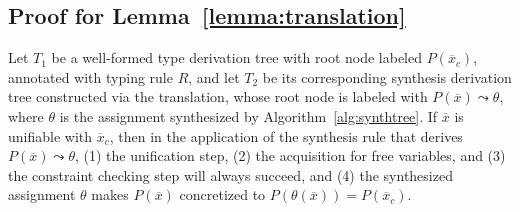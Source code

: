 \subsection{Proof for Lemma~\ref{lemma:translation}}
\label{sec:appendix-lemma3}
\begin{lemma}
Let $T_1$ be a well-formed type derivation tree with root node labeled $P(\overline{x}_c)$, annotated with typing rule $R$, and let $T_2$ be its corresponding synthesis derivation tree constructed via the translation, whose root node is labeled with $P(\overline{x}) \leadsto \theta$, where $\theta$ is the assignment synthesized by Algorithm~\ref{alg:synthtree}.
If $\overline{x}$ is unifiable with $\overline{x}_c$, then in the application of the synthesis rule that derives $P(\overline{x}) \leadsto \theta$, (1) the unification step, (2) the acquisition for free variables, and (3) the constraint checking step will always succeed, and (4) the synthesized assignment $\theta$ makes $P(\overline{x})$ concretized to $P(\theta(\overline{x})) = P(\overline{x}_c)$.
\end{lemma}

